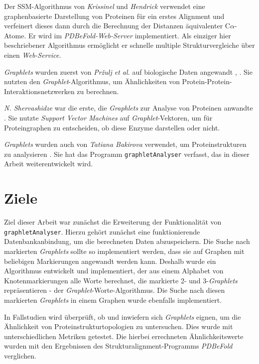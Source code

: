 \documentclass{report}
\begin{document}
Der SSM-Algorithmus von \textit{Krissinel} und \textit{Hendrick} \cite{pdbefold} verwendet eine graphenbasierte Darstellung von Proteinen f\"ur ein erstes Alignment und verfeinert dieses dann durch die Berechnung der Distanzen \"aquivalenter C$\alpha$-Atome. Er wird im \textit{PDBeFold-Web-Server} implementiert. Als einziger hier beschriebener Algorithmus erm\"oglicht er schnelle multiple Strukturvergleiche \"uber einen \textit{Web-Service}.

\textit{Graphlets} wurden zuerst von \textit{Pr{\v z}ulj et al.} auf biologische Daten angewandt \cite{frqdistribution}, \cite{graphletfrequency}. Sie nutzten den \textit{Graphlet}-Algorithmus, um \"Ahnlichkeiten von Protein-Protein-Interaktionsnetzwerken zu berechnen.

\textit{N. Shervashidze} war die erste, die \textit{Graphlets} zur Analyse von Proteinen anwandte \cite{sherv_graphlets}. Sie nutzte \textit{Support Vector Machines} auf \textit{Graphlet}-Vektoren, um  f\"ur Proteingraphen zu entscheiden, ob diese Enzyme darstellen oder nicht.

\textit{Graphlets} wurden auch von \textit{Tatiana Bakirova} verwendet, um Proteinstrukturen zu analysieren \cite{bakirova2013comparison}. Sie hat das Programm \texttt{graphletAnalyser} verfasst, das in dieser Arbeit weiterentwickelt wird.

\section{Ziele}

Ziel dieser Arbeit war zun\"achst die Erweiterung der Funktionalit\"at von \\ \texttt{graphletAnalyser}. Hierzu geh\"ort zun\"achst eine funktionierende Datenbankanbindung, um die berechneten Daten abzuspeichern.
Die Suche nach markierten \textit{Graphlets} sollte so implementiert werden, dass sie auf Graphen mit beliebigen Markierungen angewandt werden kann. Deshalb wurde ein Algorithmus entwickelt und implementiert, der aus einem Alphabet von Knotenmarkierungen alle Worte berechnet, die markierte  2- und 3-\textit{Graphlets} repr\"asentieren - der \textit{Graphlet}-Worte-Algorithmus. Die Suche nach diesen markierten \textit{Graphlets} in einem Graphen wurde ebenfalls implementiert.

In Fallstudien wird \"uberpr\"uft, ob und inwiefern sich \textit{Graphlets} eignen, um die \"Ahnlichkeit von Proteinstrukturtopologien zu untersuchen. Dies wurde mit unterschiedlichen Metriken getestet. Die hierbei errechneten \"Ahnlichkeitswerte wurden mit den Ergebnissen des Strukturalignment-Programms \textit{PDBeFold} \cite{pdbefold} verglichen.
\end{document}

